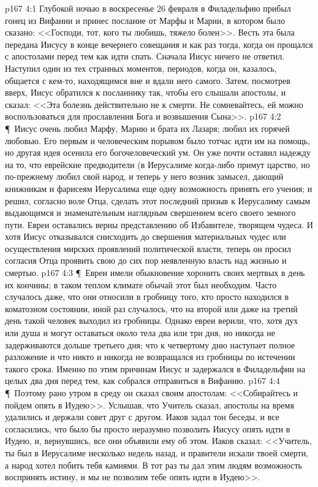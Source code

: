 \vs p167 4:1 Глубокой ночью в воскресенье 26 февраля в Филадельфию прибыл гонец из Вифании и принес послание от Марфы и Марии, в котором было сказано: <<Господи, тот, кого ты любишь, тяжело болен>>. Весть эта была передана Иисусу в конце вечернего совещания и как раз тогда, когда он прощался с апостолами перед тем как идти спать. Сначала Иисус ничего не ответил. Наступил один из тех странных моментов, периодов, когда он, казалось, общается с кем\hyp{}то, находящимся вне и вдали него самого. Затем, посмотрев вверх, Иисус обратился к посланнику так, чтобы его слышали апостолы, и сказал: <<Эта болезнь действительно не к смерти. Не сомневайтесь, ей можно воспользоваться для прославления Бога и возвышения Сына>>.
\vs p167 4:2 \P\ Иисус очень любил Марфу, Марию и брата их Лазаря; любил их горячей любовью. Его первым и человеческим порывом было тотчас идти им на помощь, но другая идея осенила его богочеловеческий ум. Он уже почти оставил надежду на то, что еврейские предводители (в Иерусалиме когда\hyp{}либо примут царство, но по\hyp{}прежнему любил свой народ, и теперь у него возник замысел, дающий книжникам и фарисеям Иерусалима еще одну возможность принять его учения; и решил, согласно воле Отца, сделать этот последний призыв к Иерусалиму самым выдающимся и знаменательным наглядным свершением всего своего земного пути. Евреи оставались верны представлению об Избавителе, творящем чудеса. И хотя Иисус отказывался снисходить до свершения материальных чудес или осуществления мирских проявлений политической власти, теперь он просил согласия Отца проявить свою до сих пор неявленную власть над жизнью и смертью.
\vs p167 4:3 \P\ Евреи имели обыкновение хоронить своих мертвых в день их кончины; в таком теплом климате обычай этот был необходим. Часто случалось даже, что они относили в гробницу того, кто просто находился в коматозном состоянии, иной раз случалось, что на второй или даже на третий день такой человек выходил из гробницы. Однако евреи верили, что, хотя дух или душа и могут оставаться около тела два или три дня, но никогда не задерживаются дольше третьего дня; что к четвертому дню наступает полное разложение и что никто и никогда не возвращался из гробницы по истечении такого срока. Именно по этим причинам Иисус и задержался в Филадельфии на целых два дня перед тем, как собрался отправиться в Вифанию.
\vs p167 4:4 \P\ Поэтому рано утром в среду он сказал своим апостолам: <<Собирайтесь и пойдем опять в Иудею>>. Услышав, что Учитель сказал, апостолы на время удалились и держали совет друг с другом. Иаков задал тон беседы, и все согласились, что было бы просто неразумно позволить Иисусу опять идти в Иудею, и, вернувшись, все они объявили ему об этом. Иаков сказал: <<Учитель, ты был в Иерусалиме несколько недель назад, и правители искали твоей смерти, а народ хотел побить тебя камнями. В тот раз ты дал этим людям возможность воспринять истину, и мы не позволим тебе опять идти в Иудею>>.
